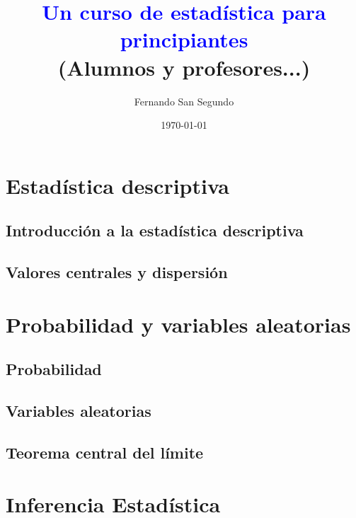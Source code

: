 \documentclass[10pt,a4paper]{book}
\begin{document}
\author{Fernando San Segundo}
\title{\textcolor{blue}{Un curso de estadística para principiantes}\\
{\small (Alumnos y profesores...)}}
\date{\today}

\pagestyle{plain}
\maketitle

\setcounter{tocdepth}{1}
\tableofcontents


\part{Estadística descriptiva}
%

    \chapter{Introducción a la estadística descriptiva}%
    

    \chapter{Valores centrales y dispersión}
    

\part{Probabilidad y variables aleatorias}
%   

    \chapter{Probabilidad}
    

    \chapter{Variables aleatorias}
    


    \chapter{Teorema central del límite}
    


\part{Inferencia Estadística}
%  
\end{document}

